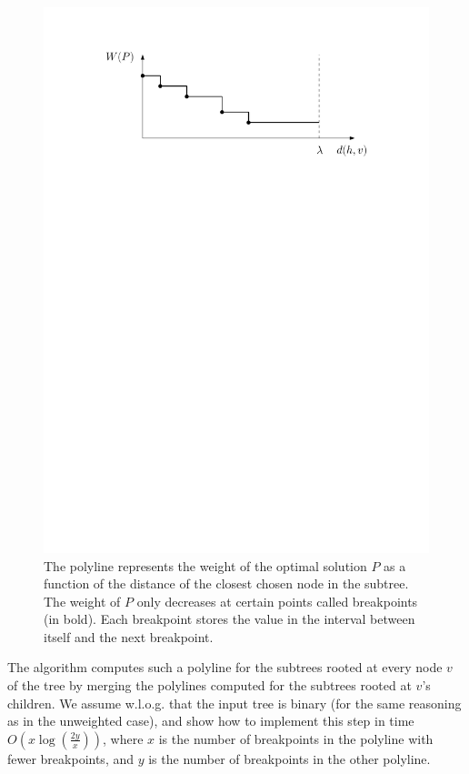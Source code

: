 \documentclass[11pt,a4paper]{article}
\theoremstyle{definition}
\theoremstyle{remark}
\begin{document}
\begin{figure}[h]
\begin{center}
\includegraphics[scale=0.55]{polyline}
\end{center}
\caption{The polyline represents the weight of the optimal solution $P$ as a function of the distance of the closest chosen node in the subtree. %
The weight of $P$ only decreases at certain points called breakpoints (in bold). Each breakpoint stores the value in the interval between itself and the next breakpoint.
\label{figure of a polyline}}
\end{figure}


The algorithm computes such a polyline for the subtrees rooted at every node $v$ of the tree by merging the polylines computed for the subtrees rooted at $v$'s children. We assume w.l.o.g. that the input tree is binary (for the same reasoning as in the unweighted case), and show how to
implement this step in time $O(x \log (\frac{2y}{x}))$, where $x$ is the number of breakpoints in the polyline with fewer breakpoints, and $y$ is the number of breakpoints in the other polyline.
\end{document}
